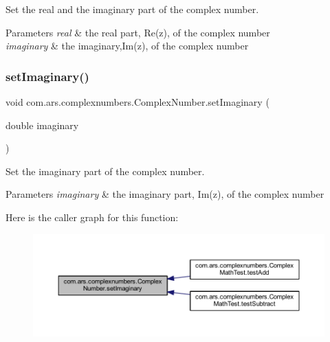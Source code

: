 Set the real and the imaginary part of the complex number. 
\begin{DoxyParams}{Parameters}
{\em real} & the real part, Re(z), of the complex number \\
\hline
{\em imaginary} & the imaginary,Im(z), of the complex number \\
\hline
\end{DoxyParams}
\hypertarget{classcom_1_1ars_1_1complexnumbers_1_1_complex_number_a728d224cd650d2e5ab62acd3159a4989}{}\label{classcom_1_1ars_1_1complexnumbers_1_1_complex_number_a728d224cd650d2e5ab62acd3159a4989} 
\subsubsection{\texorpdfstring{set\+Imaginary()}{setImaginary()}}
{\footnotesize\ttfamily void com.\+ars.\+complexnumbers.\+Complex\+Number.\+set\+Imaginary (\begin{DoxyParamCaption}\item[{double}]{imaginary }\end{DoxyParamCaption})}

Set the imaginary part of the complex number. 
\begin{DoxyParams}{Parameters}
{\em imaginary} & the imaginary part, Im(z), of the complex number \\
\hline
\end{DoxyParams}
Here is the caller graph for this function\+:
\nopagebreak
\begin{figure}[H]
\begin{center}
\leavevmode
\includegraphics[width=350pt]{classcom_1_1ars_1_1complexnumbers_1_1_complex_number_a728d224cd650d2e5ab62acd3159a4989_icgraph}
\end{center}
\end{figure}
\hypertarget{classcom_1_1ars_1_1complexnumbers_1_1_complex_number_ae13ab597ac2208a3915398ee075a7b69}{}\label{classcom_1_1ars_1_1complexnumbers_1_1_complex_number_ae13ab597ac2208a3915398ee075a7b69} 
